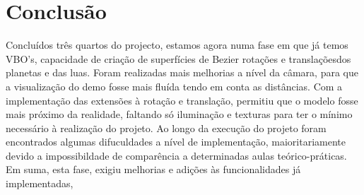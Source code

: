 \chapter{Conclusão}

Concluídos três quartos do projecto, estamos agora numa fase em que já temos VBO's, capacidade de criação de superfícies de Bezier rotações e translaçõesdos planetas e das luas.
Foram realizadas mais melhorias a nível da câmara, para que a visualização do demo fosse mais fluída tendo em conta as distâncias.
Com a implementação das extensões à rotação e translação, permitiu que o modelo fosse mais próximo da realidade, faltando só iluminação e texturas para ter o mínimo necessário à realização do projeto.
Ao longo da execução do projeto foram encontrados algumas difuculdades a nível de implementação, maioritariamente devido a impossibildade de comparência a determinadas aulas teórico-práticas. 
Em suma, esta fase, exigiu melhorias e adições às funcionalidades já implementadas, 
